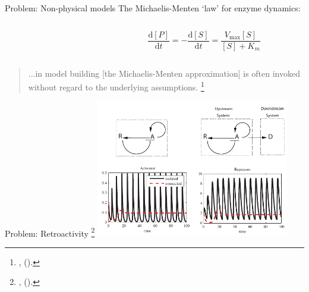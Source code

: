 \documentclass[11pt,reqno]{beamer}
\newcommand{\D}[2]{\frac{\mathrm{d} #1}{\mathrm{d} #2}}
\newcommand{\fcite}[1]{
\footnote{\tiny\cite{#1}, (\citeyear{#1}).}
}
\begin{document}
\begin{frame}{Problem: Non-physical models}
The Michaelis-Menten `law' for enzyme dynamics:
\begin{columns}
	\begin{column}{0.45\linewidth}
	\end{column}
	\begin{column}{0.45\linewidth}
		\[
		\D{[P]}{t}= - \D{[S]}{t} = \frac{V_\text{max}[S]}{[S] + K_m}
		\]
	\end{column}
\end{columns}
\vfill

\begin{block}{}
	\begin{quote}
		...in model building [the Michaelis-Menten approximation] is often invoked without regard to the underlying assumptions.\fcite{Keener2009}
	\end{quote}
\end{block}
\end{frame}
\begin{frame}{Problem: Retroactivity\fcite{DelVecchio2013}}
\includegraphics[height=6cm]{activator-repressor-ddv}
\end{frame}
\end{document}
